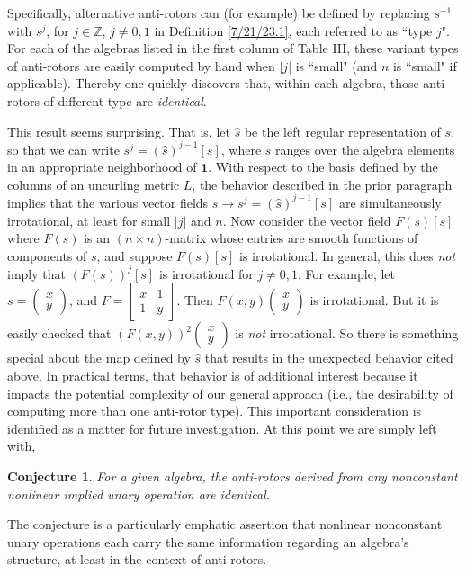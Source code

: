 \documentclass{amsart}
\numberwithin{equation}{section}
\newtheorem*{conjecture}{Conjecture}
\theoremstyle{definition}
\numberwithin{theorem}{section}
\begin{document}
  Specifically, alternative anti-rotors can (for example) be defined by replacing $s^{-1}$ with $s^j$, for $j\in\mathbb{Z}$, $j\ne 0,1$ in Definition \ref{7/21/23.1}, each referred to as ``type $j$".  For each of the algebras listed in the first column of Table III, these variant types of anti-rotors are easily computed by hand when  $|j|$ is ``small" (and $n$ is ``small" if applicable).  
Thereby one quickly discovers that, within each algebra, those anti-rotors of different type are {\it identical}.  

This result seems surprising.  That is, let $\hat{s}$ be the left regular representation of $s$, so that we can write $s^j = (\hat{s})^{j-1}[s]$, where $s$ ranges over the algebra elements in an appropriate neighborhood of $\mathbf{1}$. With respect to the basis defined by the columns of an uncurling metric $L$, the behavior described in the prior paragraph implies that the various vector fields $s\rightarrow s^j = (\hat{s})^{j-1}[s]$ are simultaneously irrotational, at least for small $|j|$ and $n$.  Now consider the vector field $F(s)[s]$ where $F(s)$ is an $(n\times n)$-matrix whose entries are smooth functions of components of $s$, and suppose $F(s)[s]$ is \mbox{irrotational}.  In general, this does {\it not} imply that $(F(s))^j[s]$ is irrotational for $j\ne 0,1$. For example, let $s=\left(\begin{array}{ccc}
 x   \\ 
y    
\end{array}\right)$, and $F= \left[\begin{array}{ccc}
x & 1   \\ 
 1 & y    
\end{array}\right]$.  Then $F(x,y)\left(\begin{array}{ccc}
 x   \\ 
y    
\end{array}\right)$ is irrotational.  But it is easily checked that $(F(x,y))^2\left(\begin{array}{ccc}
 x   \\ 
y    
\end{array}\right)$ is {\it not} irrotational.  So there is something special about the map defined by $\hat{s}$ that results in the unexpected behavior cited above. 
In practical terms, that behavior is of additional interest because it impacts the potential complexity of our general approach (i.e., the desirability of computing more than one anti-rotor type).  This important consideration is identified as a matter for future investigation. At this point we are simply left with,
\begin{conjecture} For a given algebra, the anti-rotors derived from any nonconstant nonlinear implied unary operation are identical. 
\end{conjecture}
\noindent The conjecture is a particularly emphatic assertion that nonlinear nonconstant unary operations each carry the same information regarding an algebra's structure, at least in the context of anti-rotors. 
\end{document}
